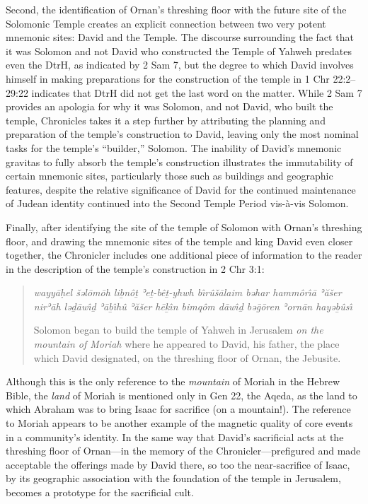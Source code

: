 Second, the identification of Ornan's threshing floor with the future
site of the Solomonic Temple creates an explicit connection between two
very potent mnemonic sites: David and the Temple. The discourse
surrounding the fact that it was Solomon and not David who constructed
the Temple of Yahweh predates even the DtrH, as indicated by 2 Sam 7,
but the degree to which David involves himself in making preparations
for the construction of the temple in 1 Chr 22:2--29:22 indicates that
DtrH did not get the last word on the matter. While 2 Sam 7 provides an
apologia for why it was Solomon, and not David, who built the temple,
Chronicles takes it a step further by attributing the planning and
preparation of the temple's construction to David, leaving only the most
nominal tasks for the temple's ``builder,'' Solomon. The inability of
David's mnemonic gravitas to fully absorb the temple's construction
illustrates the immutability of certain mnemonic sites, particularly
those such as buildings and geographic features, despite the relative
significance of David for the continued maintenance of Judean identity
continued into the Second Temple Period vis-à-vis Solomon.

Finally, after identifying the site of the temple of Solomon with
Ornan's threshing floor, and drawing the mnemonic sites of the temple
and king David even closer together, the Chronicler includes one
additional piece of information to the reader in the description of the
temple's construction in 2 Chr 3:1:

\begin{quote}
\emph{wayyāḥel šəlōmōh liḇnôṯ ʾeṯ-bêṯ-yhwh bı̂rûšālaim bəhar hammôrı̂ā
ʾăšer nirʾāh ləḏāwı̂ḏ ʾāḇı̂hû ʾăšer hēḵı̂n bimqôm dāwı̂ḏ bəḡōren ʾornān
hayəḇûsı̂}

Solomon began to build the temple of Yahweh in Jerusalem \emph{on the
mountain of Moriah} where he appeared to David, his father, the place
which David designated, on the threshing floor of Ornan, the Jebusite.
\end{quote}

Although this is the only reference to the \emph{mountain} of Moriah in
the Hebrew Bible, the \emph{land} of Moriah is mentioned only in Gen 22,
the Aqeda, as the land to which Abraham was to bring Isaac for sacrifice
(on a mountain!).\autocite[358--359]{kalimi_htr1990} The reference to
Moriah appears to be another example of the magnetic quality of core
events in a community's identity. In the same way that David's
sacrificial acts at the threshing floor of Ornan---in the memory of the
Chronicler---prefigured and made acceptable the offerings made by David
there, so too the near-sacrifice of Isaac, by its geographic association
with the foundation of the temple in Jerusalem, becomes a prototype for
the sacrificial cult.\autocite[In fact, Vermes makes this point explicit
and traces the tradition into early Christianity.
See][204--211]{vermes1961}

